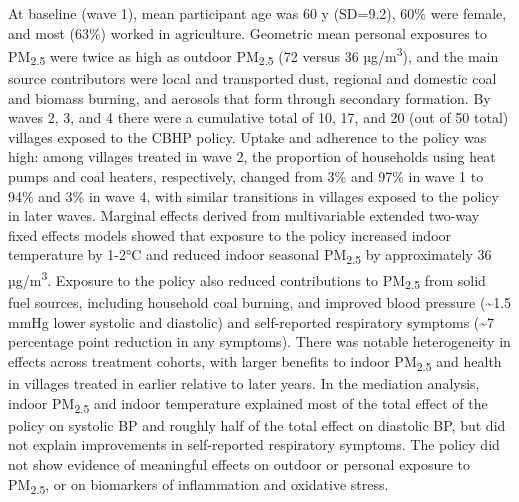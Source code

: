 \documentclass[
  letterpaper,
  DIV=11,
  numbers=noendperiod]{scrartcl}
\providecommand{\DIFadd}[1]{{\protect\color{blue}\uwave{#1}}} %
\providecommand{\DIFaddbegin}{} %
\providecommand{\DIFaddend}{} %
\providecommand{\DIFdelbegin}{} %
\providecommand{\DIFdelend}{} %
\newcommand{\DIFscaledelfig}{0.5}
\newlength{\DIFdelgraphicswidth} %
\newlength{\DIFdelgraphicsheight} %
\newcommand{\DIFaddincludegraphics}[2][]{{\color{blue}\fbox{\DIFOincludegraphics[#1]{#2}}}} %
\newcommand{\DIFdelincludegraphics}[2][]{%
\sbox{\DIFdelgraphicsbox}{\DIFOincludegraphics[#1]{#2}}%
\settoboxwidth{\DIFdelgraphicswidth}{\DIFdelgraphicsbox} %
\settoboxtotalheight{\DIFdelgraphicsheight}{\DIFdelgraphicsbox} %
\scalebox{\DIFscaledelfig}{%
\parbox[b]{\DIFdelgraphicswidth}{\usebox{\DIFdelgraphicsbox}\\[-\baselineskip] \rule{\DIFdelgraphicswidth}{0em}}\llap{\resizebox{\DIFdelgraphicswidth}{\DIFdelgraphicsheight}{%
\setlength{\unitlength}{\DIFdelgraphicswidth}%
\begin{picture}(1,1)%
\thicklines\linethickness{2pt} %
{\color[rgb]{1,0,0}\put(0,0){\framebox(1,1){}}}%
{\color[rgb]{1,0,0}\put(0,0){\line( 1,1){1}}}%
{\color[rgb]{1,0,0}\put(0,1){\line(1,-1){1}}}%
\end{picture}%
}\hspace*{3pt}}} %
} %
\DeclareRobustCommand{\DIFaddbegin}{\DIFOaddbegin \let\includegraphics\DIFaddincludegraphics} %
\DeclareRobustCommand{\DIFaddend}{\DIFOaddend \let\includegraphics\DIFOincludegraphics} %
\DeclareRobustCommand{\DIFdelbegin}{\DIFOdelbegin \let\includegraphics\DIFdelincludegraphics} %
\DeclareRobustCommand{\DIFdelend}{\DIFOaddend \let\includegraphics\DIFOincludegraphics} %
\begin{document}
At baseline (wave 1), mean participant age was 60 y (SD=9.2), 60\% were
female, and most (63\%) worked in agriculture. Geometric mean personal
exposures to PM\textsubscript{2.5} were twice as high as outdoor
PM\textsubscript{2.5} (72 versus 36 µg/m\textsuperscript{3}), and the
main source contributors were local and transported dust, regional and
domestic coal and biomass burning, and aerosols that form through
secondary formation. By waves 2, 3, and 4 there were a cumulative total
of 10, 17, and 20 (out of 50 total) villages exposed to the CBHP policy.
Uptake and adherence to the policy was high: among villages treated in
wave 2, the proportion of households using heat pumps and coal heaters,
respectively, changed from 3\% and 97\% in wave 1 to 94\% and 3\% in
wave 4, with similar transitions in villages exposed to the policy in
later waves. Marginal effects derived from multivariable extended
two-way fixed effects models showed that exposure to the policy
increased indoor temperature by 1-2°C and reduced indoor seasonal
PM\textsubscript{2.5} by approximately 36 µg/m\textsuperscript{3}.
Exposure to the policy also reduced contributions to
PM\textsubscript{2.5} from solid fuel sources, including household coal
burning, and improved blood pressure (\textasciitilde1.5 mmHg lower
systolic and diastolic) and self-reported respiratory symptoms
(\textasciitilde7 percentage point reduction in any symptoms). There was
notable heterogeneity in effects across treatment cohorts, with larger
benefits to indoor PM\textsubscript{2.5} and health in villages treated
in earlier relative to later years. In the mediation analysis, indoor
PM\textsubscript{2.5} and indoor temperature explained most of the total
effect of the policy on systolic BP and roughly half of the total effect
on diastolic BP, but did not explain improvements in self-reported
respiratory symptoms. The policy did not show evidence of meaningful
effects on outdoor or personal exposure to PM\textsubscript{2.5}, or on
biomarkers of inflammation and oxidative stress.

\DIFdelbegin %
\DIFdelend \DIFaddbegin \subsubsection*{\DIFadd{Conclusions}}\label{conclusions}
\DIFaddend 
\end{document}
